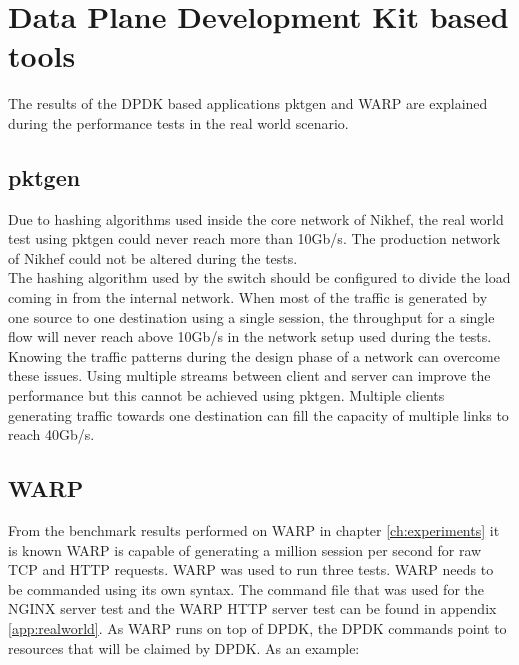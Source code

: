 \section{Data Plane Development Kit based tools}
The results of the DPDK based applications pktgen and WARP are explained during the performance tests in the real world scenario.
 
\subsection{pktgen}
Due to hashing algorithms used inside the core network of Nikhef, the real world test using pktgen could never reach more than 10Gb/s. 
The production network of Nikhef could not be altered during the tests. \\ 

The hashing algorithm used by the switch should be configured to divide the load coming in from the internal network. 
When most of the traffic is generated by one source to one destination using a single session, the throughput for a single flow will never reach above 10Gb/s in the network setup used during the tests.
Knowing the traffic patterns during the design phase of a network can overcome these issues.
Using multiple streams between client and server can improve the performance but this cannot be achieved using pktgen.
Multiple clients generating traffic towards one destination can fill the capacity of multiple links to reach 40Gb/s. \\



\subsection{WARP}
From the benchmark results performed on WARP in chapter \ref{ch:experiments} it is known WARP is capable of generating a million session per second for raw TCP and HTTP requests. 
WARP was used to run three tests. WARP needs to be commanded using its own syntax. The command file that was used for the NGINX server test and the WARP HTTP server test can be found in appendix \ref{app:realworld}. As WARP runs on top of DPDK, the DPDK commands point to resources that will be claimed by DPDK. As an example:

